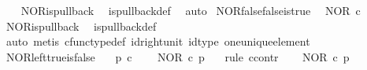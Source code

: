 \begin{isabellebody}
%
\isadelimproof
\ \ %
\endisadelimproof
%
\isatagproof
{}\isamarkupfalse%
\ NOR{\isacharunderscore}{\kern0pt}is{\isacharunderscore}{\kern0pt}pullback\ \isamarkupfalse%
\ is{\isacharunderscore}{\kern0pt}pullback{\isacharunderscore}{\kern0pt}def\ \isamarkupfalse%
\ auto%
\endisatagproof
{\isafoldproof}%
%
\isadelimproof
\isanewline
%
\endisadelimproof
\isanewline
{}\isamarkupfalse%
\ NOR{\isacharunderscore}{\kern0pt}false{\isacharunderscore}{\kern0pt}false{\isacharunderscore}{\kern0pt}is{\isacharunderscore}{\kern0pt}true{\isacharcolon}{\kern0pt}\isanewline
\ \ {\isachardoublequoteopen}NOR\ {\isasymcirc}\isactrlsub c\ {\isasymlangle}{\isasymf}{\isacharcomma}{\kern0pt}{\isasymf}{\isasymrangle}\ {\isacharequal}{\kern0pt}\ {\isasymt}{\isachardoublequoteclose}\isanewline
%
\isadelimproof
\ \ %
\endisadelimproof
%
\isatagproof
{}\isamarkupfalse%
\ NOR{\isacharunderscore}{\kern0pt}is{\isacharunderscore}{\kern0pt}pullback\ \isamarkupfalse%
\ is{\isacharunderscore}{\kern0pt}pullback{\isacharunderscore}{\kern0pt}def\ \isanewline
\ \ \isamarkupfalse%
\ {\isacharparenleft}{\kern0pt}auto{\isacharcomma}{\kern0pt}\ metis\ cfunc{\isacharunderscore}{\kern0pt}type{\isacharunderscore}{\kern0pt}def\ id{\isacharunderscore}{\kern0pt}right{\isacharunderscore}{\kern0pt}unit\ id{\isacharunderscore}{\kern0pt}type\ one{\isacharunderscore}{\kern0pt}unique{\isacharunderscore}{\kern0pt}element{\isacharparenright}{\kern0pt}%
\endisatagproof
{\isafoldproof}%
%
\isadelimproof
\isanewline
%
\endisadelimproof
\isanewline
{}\isamarkupfalse%
\ NOR{\isacharunderscore}{\kern0pt}left{\isacharunderscore}{\kern0pt}true{\isacharunderscore}{\kern0pt}is{\isacharunderscore}{\kern0pt}false{\isacharcolon}{\kern0pt}\isanewline
\ \ \ {\isachardoublequoteopen}p\ {\isasymin}\isactrlsub c\ {\isasymOmega}{\isachardoublequoteclose}\isanewline
\ \ \ {\isachardoublequoteopen}NOR\ {\isasymcirc}\isactrlsub c\ {\isasymlangle}{\isasymt}{\isacharcomma}{\kern0pt}p{\isasymrangle}\ {\isacharequal}{\kern0pt}\ {\isasymf}{\isachardoublequoteclose}\isanewline
%
\isadelimproof
%
\endisadelimproof
%
\isatagproof
{}\isamarkupfalse%
\ {\isacharparenleft}{\kern0pt}rule\ ccontr{\isacharparenright}{\kern0pt}\isanewline
\ \ \isamarkupfalse%
\ {\isachardoublequoteopen}NOR\ {\isasymcirc}\isactrlsub c\ {\isasymlangle}{\isasymt}{\isacharcomma}{\kern0pt}p{\isasymrangle}\ {\isasymnoteq}\ {\isasymf}{\isachardoublequoteclose}\isanewline

\end{isabellebody}
